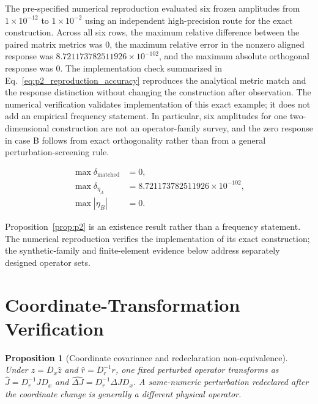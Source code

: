 \documentclass[preprint,12pt]{elsarticle}
\newtheorem{proposition}{Proposition}
\theoremstyle{definition}
\begin{document}
The pre-specified numerical reproduction evaluated six frozen amplitudes from $1\allowbreak\times10^{-12}$ to $1\allowbreak\times10^{-2}$ using an independent high-precision route for the exact construction. Across all six rows, the maximum relative difference between the paired matrix metrics was $0$, the maximum relative error in the nonzero aligned response was $8.721173782511926\allowbreak\times10^{-102}$, and the maximum absolute orthogonal response was $0$. The implementation check summarized in Eq.~\eqref{eq:p2_reproduction_accuracy} reproduces the analytical metric match and the response distinction without changing the construction after observation. The numerical verification validates implementation of this exact example; it does not add an empirical frequency statement. In particular, six amplitudes for one two-dimensional construction are not an operator-family survey, and the zero response in case B follows from exact orthogonality rather than from a general perturbation-screening rule.

\begin{linenomath*}
\begin{equation}
\begin{aligned}
\max \delta_{\mathrm{matched}} &= 0,\\
\max \delta_{\eta_A} &= 8.721173782511926\times10^{-102},\\
\max |\eta_B| &= 0.
\end{aligned}
\label{eq:p2_reproduction_accuracy}
\end{equation}
\end{linenomath*}

Proposition~\ref{prop:p2} is an existence result rather than a frequency statement. The numerical reproduction verifies the implementation of its exact construction; the synthetic-family and finite-element evidence below address separately designed operator sets.

\FloatBarrier
\section{Coordinate-Transformation Verification}
\label{sec:coordinate}

\begin{proposition}[Coordinate covariance and redeclaration non-equivalence]
\label{prop:p3}
Under $z=D_x\widehat z$ and $\widehat r=D_r^{-1}r$, one fixed
perturbed operator transforms as
$\widehat J=D_r^{-1}JD_x$ and
$\widehat{\Delta J}=D_r^{-1}\Delta JD_x$. A same-numeric perturbation
redeclared after the coordinate change is generally a different physical
operator.
\end{proposition}
\end{document}
